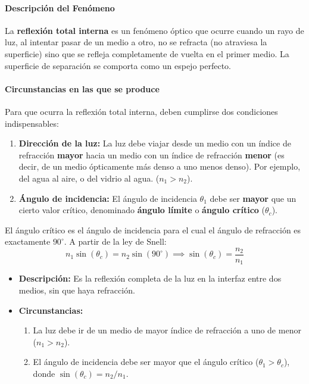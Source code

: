 \paragraph*{Descripción del Fenómeno}
La \textbf{reflexión total interna} es un fenómeno óptico que ocurre cuando un rayo de luz, al intentar pasar de un medio a otro, no se refracta (no atraviesa la superficie) sino que se refleja completamente de vuelta en el primer medio. La superficie de separación se comporta como un espejo perfecto.

\paragraph*{Circunstancias en las que se produce}
Para que ocurra la reflexión total interna, deben cumplirse dos condiciones indispensables:
\begin{enumerate}
    \item \textbf{Dirección de la luz:} La luz debe viajar desde un medio con un índice de refracción \textbf{mayor} hacia un medio con un índice de refracción \textbf{menor} (es decir, de un medio ópticamente más denso a uno menos denso). Por ejemplo, del agua al aire, o del vidrio al agua. ($n_1 > n_2$).
    \item \textbf{Ángulo de incidencia:} El ángulo de incidencia $\theta_1$ debe ser \textbf{mayor} que un cierto valor crítico, denominado \textbf{ángulo límite} o \textbf{ángulo crítico} ($\theta_c$).
\end{enumerate}
El ángulo crítico es el ángulo de incidencia para el cual el ángulo de refracción es exactamente $90^\circ$. A partir de la ley de Snell:
$$ n_1 \sin(\theta_c) = n_2 \sin(90^\circ) \implies \sin(\theta_c) = \frac{n_2}{n_1} $$

\begin{cajaresultado}
\begin{itemize}
    \item \textbf{Descripción:} Es la reflexión completa de la luz en la interfaz entre dos medios, sin que haya refracción.
    \item \textbf{Circunstancias:}
    \begin{enumerate}
        \item La luz debe ir de un medio de mayor índice de refracción a uno de menor ($n_1 > n_2$).
        \item El ángulo de incidencia debe ser mayor que el ángulo crítico ($\theta_1 > \theta_c$), donde $\sin(\theta_c) = n_2/n_1$.
    \end{enumerate}
\end{itemize}
\end{cajaresultado}

